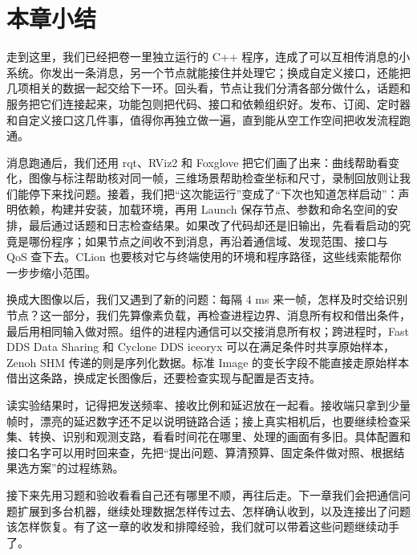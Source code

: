 \section{本章小结}
走到这里，我们已经把卷一里独立运行的 C++ 程序，连成了可以互相传消息的小系统。你发出一条消息，另一个节点就能接住并处理它；换成自定义接口，还能把几项相关的数据一起交给下一环。回头看，节点让我们分清各部分做什么，话题和服务把它们连接起来，功能包则把代码、接口和依赖组织好。发布、订阅、定时器和自定义接口这几件事，值得你再独立做一遍，直到能从空工作空间把收发流程跑通。

消息跑通后，我们还用 rqt、RViz2 和 Foxglove 把它们画了出来：曲线帮助看变化，图像与标注帮助核对同一帧，三维场景帮助检查坐标和尺寸，录制回放则让我们能停下来找问题。接着，我们把“这次能运行”变成了“下次也知道怎样启动”：声明依赖，构建并安装，加载环境，再用 Launch 保存节点、参数和命名空间的安排，最后通过话题和日志检查结果。如果改了代码却还是旧输出，先看看启动的究竟是哪份程序；如果节点之间收不到消息，再沿着通信域、发现范围、接口与 QoS 查下去。CLion 也要核对它与终端使用的环境和程序路径，这些线索能帮你一步步缩小范围。

换成大图像以后，我们又遇到了新的问题：每隔 4 ms 来一帧，怎样及时交给识别节点？这一部分，我们先算像素负载，再检查进程边界、消息所有权和借出条件，最后用相同输入做对照。组件的进程内通信可以交接消息所有权；跨进程时，Fast DDS Data Sharing 和 Cyclone DDS iceoryx 可以在满足条件时共享原始样本，Zenoh SHM 传递的则是序列化数据。标准 Image 的变长字段不能直接走原始样本借出这条路，换成定长图像后，还要检查实现与配置是否支持。

读实验结果时，记得把发送频率、接收比例和延迟放在一起看。接收端只拿到少量帧时，漂亮的延迟数字还不足以说明链路合适；接上真实相机后，也要继续检查采集、转换、识别和观测支路，看看时间花在哪里、处理的画面有多旧。具体配置和接口名字可以用时回来查，先把“提出问题、算清预算、固定条件做对照、根据结果选方案”的过程练熟。

接下来先用习题和验收看看自己还有哪里不顺，再往后走。下一章我们会把通信问题扩展到多台机器，继续处理数据怎样传过去、怎样确认收到，以及连接出了问题该怎样恢复。有了这一章的收发和排障经验，我们就可以带着这些问题继续动手了。

